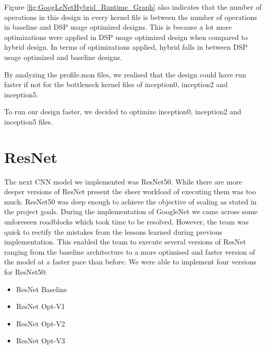 Figure \ref{fig:GoogLeNetHybrid_Runtime_Graph} also indicates that the number of operations in this design in every kernel file is between the number of operations in baseline and DSP usage optimized designs. This is because a lot more optimizations were applied in DSP usage optimized design when compared to hybrid design. In terms of optimizations applied, hybrid falls in between DSP usage optimized and baseline designs.

By analyzing the profile.mon files, we realised that the design could have run faster if not for the bottleneck kernel files of inception0, inception2 and inception5.

To run our design faster, we decided to optimize inception0, inception2 and inception5 files. 










 
 
 
 
 
 
 
 
 




























\section{ResNet}
The next CNN model we implemented was ResNet50. While there are more deeper versions of ResNet present the sheer workload of executing them was too much. ResNet50 was deep enough to achieve the objective of scaling as stated in the project goals. During the implementation of GoogleNet we came across some unforeseen roadblocks which took time to be resolved. However, the team was quick to rectify the mistakes from the lessons learned during previous implementation. This enabled the team to execute several versions of ResNet ranging from the baseline architecture to a more optimised and faster version of the model at a faster pace than before.
We were able to implement four versions for ResNet50:
\begin{itemize}
    \item ResNet Baseline
    \item ResNet Opt-V1
    \item ResNet Opt-V2
    \item ResNet Opt-V3
\end{itemize}

